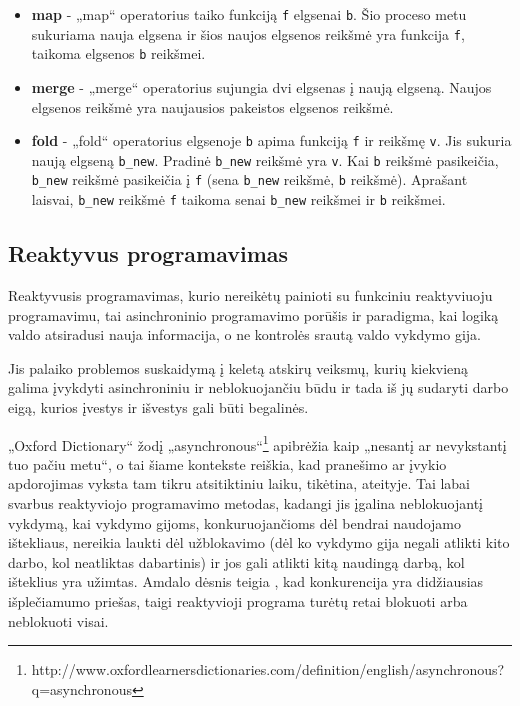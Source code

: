 \begin{itemize}
  \item \textbf{map} - „map“ operatorius taiko funkciją \lstinline|f| elgsenai \lstinline|b|. Šio proceso metu sukuriama nauja elgsena ir šios naujos elgsenos reikšmė yra funkcija \lstinline|f|, taikoma elgsenos \lstinline|b| reikšmei.
  \item \textbf{merge} - „merge“ operatorius sujungia dvi elgsenas į naują elgseną. Naujos elgsenos reikšmė yra naujausios pakeistos elgsenos reikšmė.
  \item \textbf{fold} - „fold“ operatorius elgsenoje \lstinline|b| apima funkciją \lstinline|f| ir reikšmę \lstinline|v|. Jis sukuria naują elgseną \lstinline|b_new|. Pradinė \lstinline|b_new| reikšmė yra \lstinline|v|. Kai \lstinline|b| reikšmė pasikeičia, \lstinline|b_new| reikšmė pasikeičia į \lstinline|f| (sena \lstinline|b_new| reikšmė, \lstinline|b| reikšmė). Aprašant laisvai, \lstinline|b_new| reikšmė \lstinline|f| taikoma senai \lstinline|b_new| reikšmei ir \lstinline|b| reikšmei.
\end{itemize}

\subsection{Reaktyvus programavimas}

Reaktyvusis programavimas, kurio nereikėtų painioti su funkciniu reaktyviuoju programavimu, tai asinchroninio programavimo porūšis ir paradigma, kai logiką valdo atsiradusi nauja informacija, o ne kontrolės srautą valdo vykdymo gija.

Jis palaiko problemos suskaidymą į keletą atskirų veiksmų, kurių kiekvieną galima įvykdyti asinchroniniu ir neblokuojančiu būdu ir tada iš jų sudaryti darbo eigą, kurios įvestys ir išvestys gali būti begalinės.

„Oxford Dictionary“ žodį „asynchronous“\footnote{http://www.oxfordlearnersdictionaries.com/definition/english/asynchronous?q=asynchronous} apibrėžia kaip „nesantį ar nevykstantį tuo pačiu metu“, o tai šiame kontekste reiškia, kad pranešimo ar įvykio apdorojimas vyksta tam tikru atsitiktiniu laiku, tikėtina, ateityje. Tai labai svarbus reaktyviojo programavimo metodas, kadangi jis įgalina neblokuojantį vykdymą, kai vykdymo gijoms, konkuruojančioms dėl bendrai naudojamo ištekliaus, nereikia laukti dėl užblokavimo (dėl ko vykdymo gija negali atlikti kito darbo, kol neatliktas dabartinis) ir jos gali atlikti kitą naudingą darbą, kol išteklius yra užimtas. Amdalo dėsnis teigia \cite{Rodgers:1985:IMS:327070.327215}, kad konkurencija yra didžiausias išplečiamumo priešas, taigi reaktyvioji programa turėtų retai blokuoti arba neblokuoti visai.

